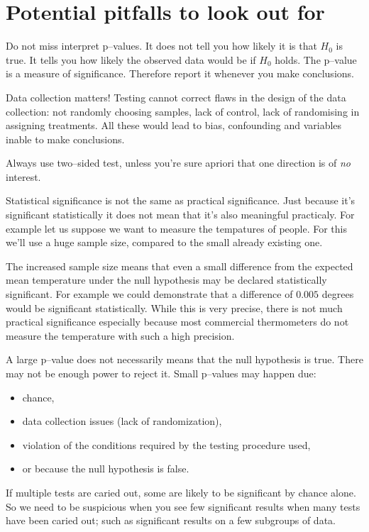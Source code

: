\section{Potential pitfalls to look out for}

Do not miss interpret p--values. It does not tell you how likely it is that
$H_0$ is true. It tells you how likely the observed data would be if $H_0$
holds. The p--value is a measure of significance. Therefore report it whenever
you make conclusions.

Data collection matters! Testing cannot correct flaws in the design of the data
collection: not randomly choosing samples, lack of control, lack of randomising
in assigning treatments. All these would lead to bias, confounding and variables
inable to make conclusions.

Always use two--sided test, unless you're sure apriori that one direction is of
\emph{no} interest.

Statistical significance is not the same as practical significance. Just because
it's significant statistically it does not mean that it's also meaningful
practicaly. For example let us suppose we want to measure the tempatures of
people. For this we'll use a huge sample size, compared to the small already
existing one.

The increased sample size means that even a small difference from the expected
mean temperature under the null hypothesis may be declared statistically significant.
For example we could demonstrate that a difference of $0.005$ degrees would be
significant statistically. While this is very precise, there is not much
practical significance especially because most commercial thermometers do not
measure the temperature with such a high precision.

A large p--value does not necessarily means that the null hypothesis is true.
There may not be enough power to reject it. Small p--values may happen due:

\begin{itemize}
  \item chance,
  \item data collection issues (lack of randomization),
  \item violation of the conditions required by the testing procedure used,
  \item or because the null hypothesis is false.
\end{itemize}

If multiple tests are caried out, some are likely to be significant by chance
alone. So we need to be suspicious when you see few significant results when
many tests have been caried out; such as significant results on a few subgroups
of data.

